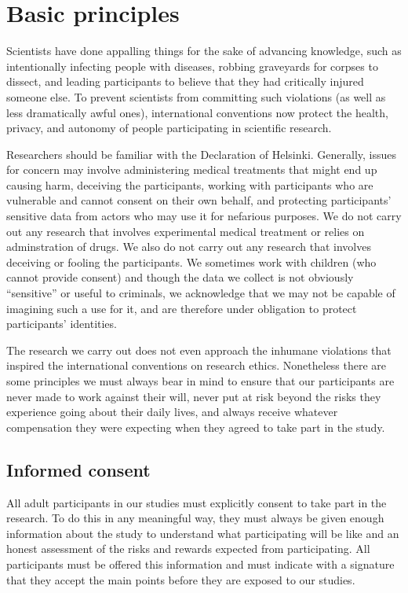 \documentclass[12pt,]{book}
\theoremstyle{definition}
\theoremstyle{definition}
\theoremstyle{definition}
\theoremstyle{remark}
\begin{document}
\section{Basic principles}\label{basic-principles}

Scientists have done appalling things for the sake of advancing
knowledge, such as intentionally infecting people with diseases, robbing
graveyards for corpses to dissect, and leading participants to believe
that they had critically injured someone else. To prevent scientists
from committing such violations (as well as less dramatically awful
ones), international conventions now protect the health, privacy, and
autonomy of people participating in scientific research.

Researchers should be familiar with the Declaration of Helsinki.
Generally, issues for concern may involve administering medical
treatments that might end up causing harm, deceiving the participants,
working with participants who are vulnerable and cannot consent on their
own behalf, and protecting participants' sensitive data from actors who
may use it for nefarious purposes. We do not carry out any research that
involves experimental medical treatment or relies on adminstration of
drugs. We also do not carry out any research that involves deceiving or
fooling the participants. We sometimes work with children (who cannot
provide consent) and though the data we collect is not obviously
``sensitive'' or useful to criminals, we acknowledge that we may not be
capable of imagining such a use for it, and are therefore under
obligation to protect participants' identities.

The research we carry out does not even approach the inhumane violations
that inspired the international conventions on research ethics.
Nonetheless there are some principles we must always bear in mind to
ensure that our participants are never made to work against their will,
never put at risk beyond the risks they experience going about their
daily lives, and always receive whatever compensation they were
expecting when they agreed to take part in the study.

\subsection{Informed consent}\label{informed-consent}

All adult participants in our studies must explicitly consent to take
part in the research. To do this in any meaningful way, they must always
be given enough information about the study to understand what
participating will be like and an honest assessment of the risks and
rewards expected from participating. All participants must be offered
this information and must indicate with a signature that they accept the
main points before they are exposed to our studies.
\end{document}
